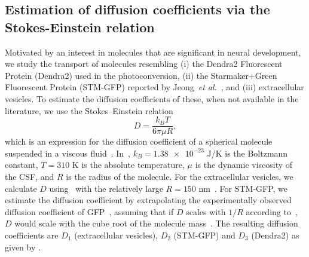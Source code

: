 \documentclass{WileyMSP-template}
\begin{document}
\subsection{Estimation of diffusion coefficients via the Stokes-Einstein relation}
Motivated by an interest in molecules that are significant in neural development,
we study the transport of molecules resembling (i) the Dendra2 Fluorescent Protein (Dendra2)
used in the photoconversion, (ii) the Starmaker+Green Fluorescent Protein (STM-GFP) reported by
Jeong~\emph{et al.}~\cite{Jeong2024TheZebrafish}, and (iii) extracellular vesicles.
To estimate the diffusion coefficients of these, when not
available in the literature, we use the Stokes--Einstein relation
\begin{equation}
    D = \frac{k_B T}{6\pi \mu R},
    \label{eq:D_stokes_einstein}
\end{equation}
which is an expression for the diffusion coefficient of a spherical
molecule suspended in a viscous fluid~\cite{Einstein1905UberTeilchen}.
In~, $k_B = \num{1.38e-23}$ J/K is the Boltzmann constant,
$T = 310$ K is the absolute temperature, $\mu$ is the dynamic viscosity of the
CSF, and $R$ is the radius of the molecule.
For the extracellular vesicles, we calculate $D$ using~
with the relatively large $R=150$ nm~\cite{Moghassemi2024ExtracellularDecade}.
For STM-GFP, we estimate the diffusion coefficient by extrapolating
the experimentally observed diffusion coefficient of
GFP~\cite{Swaminathan1997PhotobleachingDiffusion, Potma2001ReducedCells},
assuming that if $D$ scales with $1/R$ according to~,
$D$ would scale with the cube root of the molecule mass~\cite{Goodhill1997DiffusionGuidance}.
The resulting diffusion coefficients
are $D_1$ (extracellular vesicles), $D_2$ (STM-GFP) and $D_3$ (Dendra2) as given by .

\end{document}
